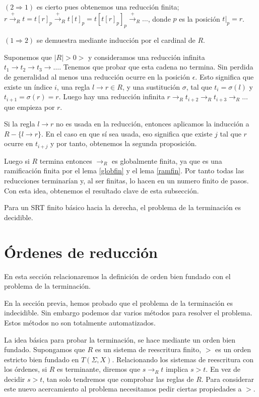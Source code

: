 \begin{demo}
  $(2 \Rightarrow 1)$ es cierto pues obtenemos una reducción finita;
  $r\xrightarrow{+}_R t = t[r]_p \xrightarrow{+}_R t[t]_p =
  t[t[r]_p]_p \xrightarrow{+}_R \dots$, donde $p$ es la posición $t|_p = r$.
  
  $(1 \Rightarrow 2)$ se demuestra mediante inducción por el cardinal
  de $R$.

  Suponemos que $|R| >0>$ y consideramos una reducción infinita
  $t_1 \rightarrow t_2 \rightarrow t_3 \rightarrow \dots$. Tenemos que
  probar que esta cadena no termina. Sin perdida de generalidad al
  menos una reducción ocurre en la posición $\epsilon$. Esto significa
  que existe un índice $i$, una regla $l \rightarrow r \in R$, y una
  sustitución $\sigma$, tal que $t_i = \sigma(l)$ y
  $t_{i+1} = \sigma(r) = r$. Luego hay una reducción infinita
  $r \rightarrow_R t_{i+2} \rightarrow_R t_{i+3} \rightarrow_R \dots$
  que empieza por $r$.

  Si la regla $l \rightarrow r$ no es usada en la reducción, entonces
  aplicamos la inducción a $R - \{l \rightarrow r\}$. En el caso en
que sí sea usada, eso significa que existe $j$ tal que $r$ ocurre en
$t_{i+j}$ y por tanto, obtenemos la segunda proposición.
\end{demo}

Luego si $R$ termina entonces $\rightarrow_R$ es globalmente finita,
ya que es una ramificación finita por el lema \ref{globfin} y el lema
\ref{ramfin}. Por tanto todas las reducciones terminarían y, al ser
finitas, lo hacen en un numero finito de pasos. Con esta idea,
obtenemos el resultado clave de esta subsección.

\begin{teor}
  Para un SRT finito básico hacia la derecha, el problema de la
  terminación es decidible.
\end{teor}

\section{Órdenes de reducción}

En esta sección relacionaremos la definición de orden bien fundado con
el problema de la terminación.

En la sección previa, hemos probado que el problema de la terminación
es indecidible. Sin embargo podemos dar varios métodos para resolver
el problema. Estos métodos no son totalmente automatizados.

La idea básica para probar la terminación, se hace mediante un orden
bien fundado. Supongamos que $R$ es un sistema de reescritura finito,
$>$ es un orden estricto bien fundado en $T(\Sigma, X)$. Relacionando
los sistemas de reescritura con los órdenes, si $R$ es terminante,
diremos que $s \rightarrow_R t$ implica $s > t$. En vez de decidir $s > t$,
tan solo tendremos que comprobar las reglas de $R$. Para considerar
este nuevo acercamiento al problema necesitamos pedir ciertas
propiedades a $>$.

